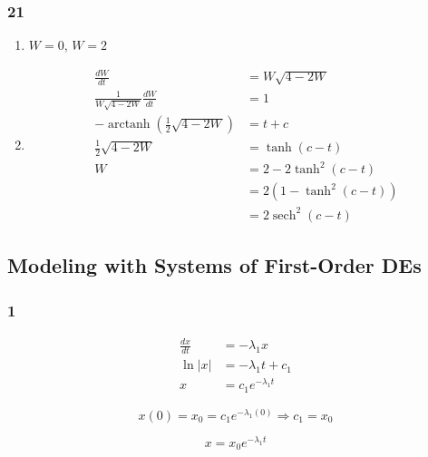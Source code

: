 \documentclass{article}
\DeclareMathOperator{\arctanh}{arctanh}
\DeclareMathOperator{\sech}{sech}
\begin{document}
\subsubsection{21}

\begin{enumerate}
  \item $W = 0$, $W = 2$

  \item

        \begin{align*}
          \frac{dW}{dt}                                       & = W \sqrt{4 - 2 W}        \\
          \frac{1}{W \sqrt{4 - 2 W}} \frac{dW}{dt}            & = 1                       \\
          -\arctanh \left( \frac{1}{2} \sqrt{4 - 2 W} \right) & = t + c                   \\
          \frac{1}{2} \sqrt{4 - 2 W}                          & = \tanh (c - t)           \\
          W                                                   & = 2 - 2 \tanh^2 (c - t)   \\
                                                              & = 2 (1 - \tanh^2 (c - t)) \\
                                                              & = 2 \sech^2 (c - t)
        \end{align*}
\end{enumerate}

\subsection{Modeling with Systems of First-Order DEs}

\subsubsection{1}

\begin{align*}
  \frac{dx}{dt} & = -\lambda_1 x         \\
  \ln |x|       & = -\lambda_1 t + c_1   \\
  x             & = c_1 e^{-\lambda_1 t}
\end{align*}

\[x(0) = x_0 = c_1 e^{-\lambda_1 (0)} \Rightarrow c_1 = x_0\]

\[x = x_0 e^{-\lambda_1 t}\]
\end{document}
